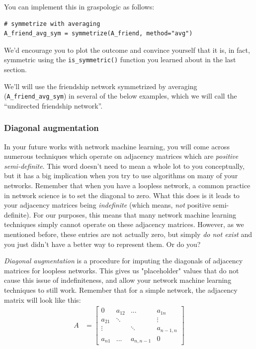 You can implement this in graspologic as follows:
\begin{lstlisting}[style=python]
# symmetrize with averaging
A_friend_avg_sym = symmetrize(A_friend, method="avg")
\end{lstlisting}
We'd encourage you to plot the outcome and convince yourself that it is, in fact, symmetric using the \texttt{is\_symmetric()} function you learned about in the last section.

We'll will use the friendship network symmetrized by averaging (\texttt{A\_friend\_avg\_sym}) in several of the below examples, which we will call the ``undirected friendship network''.

\subsubsection{Diagonal augmentation}
\label{sec:ch4:regularization:diag_aug}

In your future works with network machine learning, you will come across numerous techniques which operate on adjacency matrices which are \emph{positive semi-definite}. This word doesn't need to mean a whole lot to you conceptually, but it has a big implication when you try to use algorithms on many of your networks. Remember that when you have a loopless network, a common practice in network science is to set the diagonal to zero. What this does is it leads to your adjacency matrices being \emph{indefinite} (which means, \emph{not} positive semi-definite). For our purposes, this means that many network machine learning techniques simply cannot operate on these adjacency matrices. However, as we mentioned before, these entries are not actually zero, but simply \emph{do not exist} and you just didn't have a better way to represent them. Or do you?

\emph{Diagonal augmentation} is a procedure for imputing the diagonals of adjacency matrices for loopless networks. This gives us "placeholder" values that do not cause this issue of indefiniteness, and allow your network machine learning techniques to still work. Remember that for a simple network, the adjacency matrix will look like this:
\begin{align*}
    A &= \begin{bmatrix}
        0 & a_{12} & ... & a_{1n} \\
        a_{21}& \ddots & & \vdots \\
        \vdots & & \ddots & a_{n-1, n} \\
        a_{n1} &...& a_{n, n-1} & 0
    \end{bmatrix}
\end{align*}

